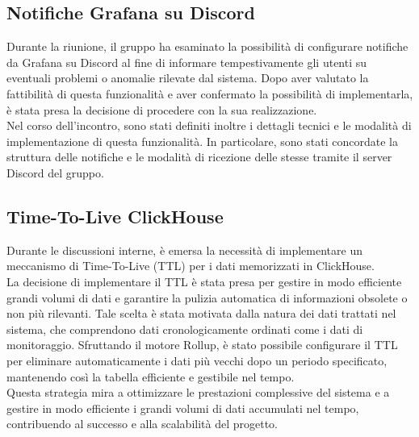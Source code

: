 \documentclass{article}
\begin{document}
    \subsection{Notifiche Grafana su Discord}
    Durante la riunione, il gruppo ha esaminato la possibilità di configurare notifiche da Grafana su Discord al fine di informare tempestivamente gli utenti su eventuali problemi o anomalie rilevate dal sistema. Dopo aver valutato la fattibilità di questa funzionalità e aver confermato la possibilità di implementarla, è stata presa la decisione di procedere con la sua realizzazione.\\
    Nel corso dell'incontro, sono stati definiti inoltre i dettagli tecnici e le modalità di implementazione di questa funzionalità. In particolare, sono stati concordate la struttura delle notifiche e le modalità di ricezione delle stesse tramite il server Discord del gruppo.

    \subsection{Time-To-Live ClickHouse}
    Durante le discussioni interne, è emersa la necessità di implementare un meccanismo di Time-To-Live (TTL) per i dati memorizzati in ClickHouse.\\
    La decisione di implementare il TTL è stata presa per gestire in modo efficiente grandi volumi di dati e garantire la pulizia automatica di informazioni obsolete o non più rilevanti. Tale scelta è stata motivata dalla natura dei dati trattati nel sistema, che comprendono dati cronologicamente ordinati come i dati di monitoraggio. Sfruttando il motore Rollup, è stato possibile configurare il TTL per eliminare automaticamente i dati più vecchi dopo un periodo specificato, mantenendo così la tabella efficiente e gestibile nel tempo.\\
    Questa strategia mira a ottimizzare le prestazioni complessive del sistema e a gestire in modo efficiente i grandi volumi di dati accumulati nel tempo, contribuendo al successo e alla scalabilità del progetto.    
\end{document}
